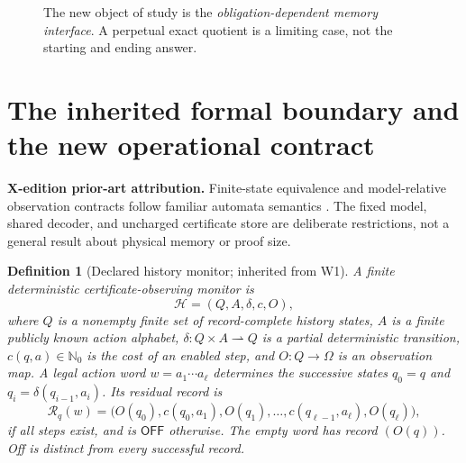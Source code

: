 \documentclass[11pt,letterpaper]{article}
\newcommand{\PriorArtNote}[1]{%
\par\smallskip\noindent\begin{minipage}{\linewidth}\small\color{black!85}%
\textbf{X-edition prior-art attribution.} #1\end{minipage}\par\smallskip}
\newtheorem{definition}[theorem]{Definition}
\newcommand{\Nzero}{\mathbb{N}_0}
\newcommand{\off}{\mathsf{OFF}}
\newcommand{\R}{\mathcal{R}}
\begin{document}
\begin{figure}[htbp]\centering
{}
\caption{The new object of study is the \emph{obligation-dependent memory interface}. A perpetual exact quotient is a limiting case, not the starting and ending answer.}\label{fig:ancestry}
\end{figure}

\section{The inherited formal boundary and the new operational contract}
\PriorArtNote{Finite-state equivalence and model-relative observation contracts follow familiar automata semantics \cite{nerode,milner}. The fixed model, shared decoder, and uncharged certificate store are deliberate restrictions, not a general result about physical memory or proof size.}
\begin{definition}[Declared history monitor; inherited from W1]\label{def:monitor}
A finite deterministic certificate-observing monitor is
\[
\mathcal H=(Q,A,\delta,c,O),
\]
where $Q$ is a \emph{nonempty finite} set of record-complete history states, $A$ is a \emph{finite} publicly known action alphabet, $\delta:Q\times A\rightharpoonup Q$ is a partial deterministic transition, $c(q,a)\in\Nzero$ is the cost of an enabled step, and $O:Q\to\Omega$ is an observation map. A legal action word $w=a_1\cdots a_\ell$ determines the successive states $q_0=q$ and $q_i=\delta(q_{i-1},a_i)$. Its \emph{residual record} is
\[
\R_q(w)=\bigl(O(q_0),c(q_0,a_1),O(q_1),\ldots,c(q_{\ell-1},a_\ell),O(q_\ell)\bigr),
\]
if all steps exist, and is $\off$ otherwise. The empty word has record $(O(q))$. Off is distinct from every successful record.
\end{definition}
\end{document}
